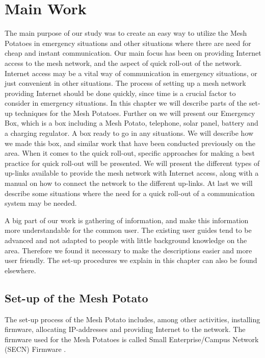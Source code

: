 \chapter{Main Work}
\label{chp:quickrollout} 

The main purpose of our study was to create an easy way to utilize the Mesh Potatoes in emergency situations and other situations where there are need for cheap and instant communication. Our main focus has been on providing Internet access to the mesh network, and the aspect of quick roll-out of the network. Internet access may be a vital way of communication in emergency situations, or just convenient in other situations. The process of setting up a mesh network providing Internet should be done quickly, since time is a crucial factor to consider in emergency situations. In this chapter we will describe parts of the set-up techniques for the Mesh Potatoes. Further on we will present our Emergency Box, which is a box including a Mesh Potato, telephone, solar panel, battery and a charging regulator. A box ready to go in any situations. We will describe how we made this box, and similar work that have been conducted previously on the area. When it comes to the quick roll-out, specific approaches for making a best practice for quick roll-out will be presented. We will present the different types of up-links available to provide the mesh network with Internet access, along with a manual on how to connect the network to the different up-links. At last we will describe some situations where the need for a quick roll-out of a communication system may be needed. 

A big part of our work is gathering of information, and make this information more understandable for the common user. The existing user guides tend to be advanced and not adapted to people with little background knowledge on the area. Therefore we found it necessary to make the descriptions easier and more user friendly. The set-up procedures we explain in this chapter can also be found elsewhere. 


\section{Set-up of the Mesh Potato}
The set-up process of the Mesh Potato includes, among other activities, installing firmware, allocating IP-addresses and providing Internet to the network. The firmware used for the Mesh Potatoes is called Small Enterprise/Campus Network (SECN) Firmware \cite{ChoosingFirmware}. 

